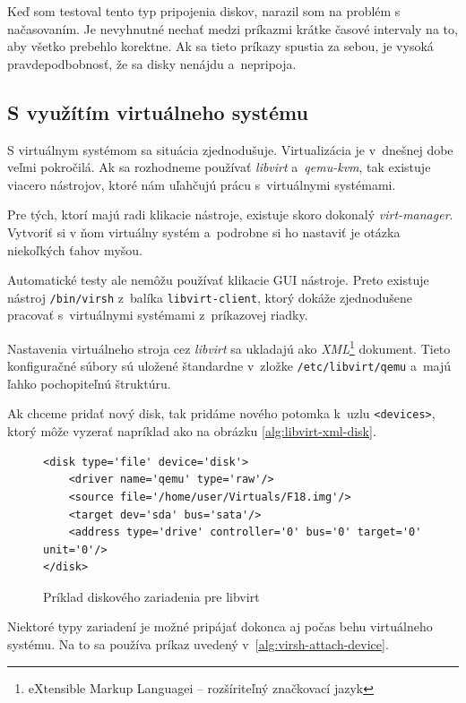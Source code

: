 Keď som testoval tento typ pripojenia diskov, narazil som na problém s
načasovaním. Je nevyhnutné nechať medzi príkazmi krátke časové intervaly na to,
aby všetko prebehlo korektne. Ak sa tieto príkazy spustia za sebou, je vysoká
pravdepodbobnosť, že sa disky nenájdu a~nepripoja.

%
%

\subsection{S využítím virtuálneho systému}

S virtuálnym systémom sa situácia zjednodušuje. Virtualizácia je v~dnešnej dobe
veľmi pokročilá. Ak sa rozhodneme používať \emph{libvirt} a~\emph{qemu-kvm},
tak existuje viacero nástrojov, ktoré nám uľahčujú prácu s~virtuálnymi
systémami.

Pre tých, ktorí majú radi klikacie nástroje, existuje skoro dokonalý
\emph{virt-manager}. Vytvoriť si v ňom virtuálny systém a~podrobne si ho
nastaviť je otázka niekoľkých ťahov myšou. 

Automatické testy ale nemôžu používať klikacie GUI nástroje. Preto existuje
nástroj \texttt{/bin/virsh} z~balíka \texttt{libvirt-client}, ktorý dokáže
zjednodušene pracovať s~virtuálnymi systémami z~príkazovej riadky.  

Nastavenia virtuálneho stroja cez \emph{libvirt} sa ukladajú ako
\emph{XML}\footnote{eXtensible Markup Languagei -- rozšíriteľný značkovací
jazyk} dokument. Tieto konfiguračné súbory sú uložené štandardne v~zložke
\texttt{/etc/libvirt/qemu} a~majú ľahko pochopiteľnú štruktúru.

Ak chceme pridať nový disk, tak pridáme nového potomka k~uzlu
\texttt{<devices>}, ktorý môže vyzerať napríklad ako na obrázku
\ref{alg:libvirt-xml-disk}.

\begin{figure}[H]
\begin{lstlisting}[label=alg:libvirt-xml-disk]
<disk type='file' device='disk'>
    <driver name='qemu' type='raw'/>
    <source file='/home/user/Virtuals/F18.img'/>
    <target dev='sda' bus='sata'/>
    <address type='drive' controller='0' bus='0' target='0' unit='0'/>
</disk>
\end{lstlisting}
\caption{Príklad diskového zariadenia pre libvirt}
\end{figure}

Niektoré typy zariadení je možné pripájať dokonca aj počas behu virtuálneho
systému. Na to sa používa príkaz uvedený v~\ref{alg:virsh-attach-device}.

